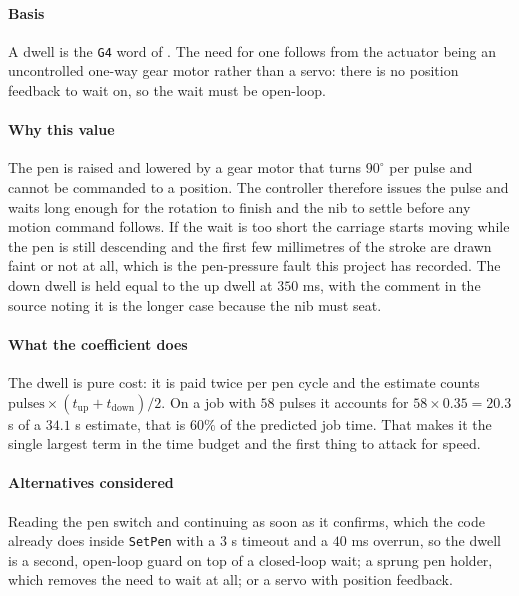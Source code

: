 \paragraph{Basis}

A dwell is the \texttt{G4} word of \cite{iso6983}. The need for one follows from the actuator being an uncontrolled one-way gear motor rather than a servo: there is no position feedback to wait on, so the wait must be open-loop.

\paragraph{Why this value}

The pen is raised and lowered by a gear motor that turns $90^\circ$ per pulse and cannot be commanded to a position. The controller therefore issues the pulse and waits long enough for the rotation to finish and the nib to settle before any motion command follows. If the wait is too short the carriage starts moving while the pen is still descending and the first few millimetres of the stroke are drawn faint or not at all, which is the pen-pressure fault this project has recorded. The down dwell is held equal to the up dwell at $350$ ms, with the comment in the source noting it is the longer case because the nib must seat.

\paragraph{What the coefficient does}

The dwell is pure cost: it is paid twice per pen cycle and the estimate counts $\text{pulses} \times (t_{\text{up}}+t_{\text{down}})/2$. On a job with $58$ pulses it accounts for $58 \times 0.35 = 20.3$ s of a $34.1$ s estimate, that is $60\%$ of the predicted job time. That makes it the single largest term in the time budget and the first thing to attack for speed.

\paragraph{Alternatives considered}

Reading the pen switch and continuing as soon as it confirms, which the code already does inside \texttt{SetPen} with a $3$ s timeout and a $40$ ms overrun, so the dwell is a second, open-loop guard on top of a closed-loop wait; a sprung pen holder, which removes the need to wait at all; or a servo with position feedback.


